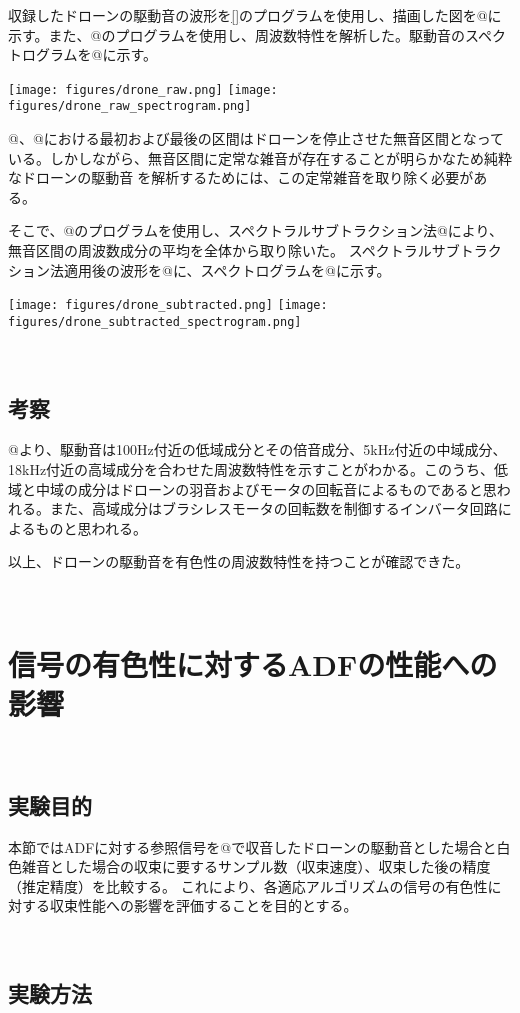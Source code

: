 収録したドローンの駆動音の波形を\ref{}のプログラムを使用し、描画した図を@に示す。また、@のプログラムを使用し、周波数特性を解析した。駆動音のスペクトログラムを@に示す。

\texttt{[image: figures/drone\_raw.png]}
\texttt{[image: figures/drone\_raw\_spectrogram.png]}

@、@における最初および最後の区間はドローンを停止させた無音区間となっている。しかしながら、無音区間に定常な雑音が存在することが明らかなため純粋なドローンの駆動音を解析するためには、この定常雑音を取り除く必要がある。

そこで、@のプログラムを使用し、スペクトラルサブトラクション法@により、無音区間の周波数成分の平均を全体から取り除いた。
スペクトラルサブトラクション法適用後の波形を@に、スペクトログラムを@に示す。

\texttt{[image: figures/drone\_subtracted.png]}
\texttt{[image: figures/drone\_subtracted\_spectrogram.png]}

\
\subsection{考察}\label{consideration-drone}

@より、駆動音は100Hz付近の低域成分とその倍音成分、5kHz付近の中域成分、18kHz付近の高域成分を合わせた周波数特性を示すことがわかる。このうち、低域と中域の成分はドローンの羽音およびモータの回転音によるものであると思われる。また、高域成分はブラシレスモータの回転数を制御するインバータ回路によるものと思われる。

以上、ドローンの駆動音を有色性の周波数特性を持つことが確認できた。

\
\section{信号の有色性に対するADFの性能への影響}\label{adf-color-effect}

\
\subsection{実験目的}\label{purpose-color}

本節ではADFに対する参照信号を@で収音したドローンの駆動音とした場合と白色雑音とした場合の収束に要するサンプル数（収束速度）、収束した後の精度（推定精度）を比較する。
これにより、各適応アルゴリズムの信号の有色性に対する収束性能への影響を評価することを目的とする。

\
\subsection{実験方法}\label{instruction-color}

